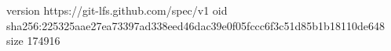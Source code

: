version https://git-lfs.github.com/spec/v1
oid sha256:225325aae27ea73397ad338eed46dac39e0f05fccc6f3c51d85b1b18110de648
size 174916
